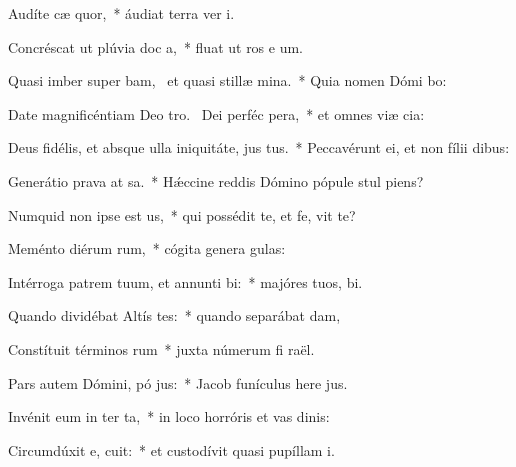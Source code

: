 \item Audíte cæ  quor,~* áudiat terra ver  i.
\item Concréscat ut plúvia doc a,~* fluat ut ros e um.
\item Quasi imber super bam,~\pscross{} et quasi stillæ  mina.~* Quia nomen Dómi bo:
\item Date magnificéntiam Deo tro.~\pscross{} Dei perféc  pera,~* et omnes viæ  cia:
\item Deus fidélis, et absque ulla iniquitáte, jus  tus.~* Peccavérunt ei, et non fílii   dibus:
\item Generátio prava at sa.~* Hǽccine reddis Dómino pópule stul  piens?
\item Numquid non ipse est  us,~* qui possédit te, et fe,  vit te?
\item Meménto diérum rum,~* cógita genera gulas:
\item Intérroga patrem tuum, et annunti bi:~* majóres tuos,   bi.
\item Quando dividébat Altís tes:~* quando separábat  dam,
\item Constítuit términos rum~* juxta númerum fi raël.
\item Pars autem Dómini, pó jus:~* Jacob funículus here jus.
\item Invénit eum in ter ta,~* in loco horróris et vas dinis:
\item Circumdúxit e,  cuit:~* et custodívit quasi pupíllam  i.
